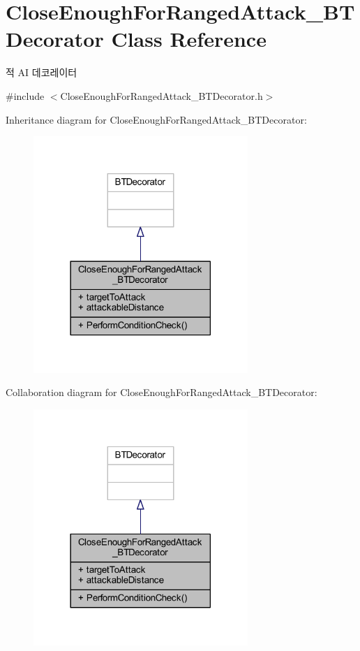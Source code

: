 \hypertarget{class_close_enough_for_ranged_attack___b_t_decorator}{}\section{Close\+Enough\+For\+Ranged\+Attack\+\_\+\+B\+T\+Decorator Class Reference}
\label{class_close_enough_for_ranged_attack___b_t_decorator}


적 AI 데코레이터  




{\ttfamily \#include $<$Close\+Enough\+For\+Ranged\+Attack\+\_\+\+B\+T\+Decorator.\+h$>$}



Inheritance diagram for Close\+Enough\+For\+Ranged\+Attack\+\_\+\+B\+T\+Decorator\+:
\nopagebreak
\begin{figure}[H]
\begin{center}
\leavevmode
\includegraphics[width=230pt]{class_close_enough_for_ranged_attack___b_t_decorator__inherit__graph}
\end{center}
\end{figure}


Collaboration diagram for Close\+Enough\+For\+Ranged\+Attack\+\_\+\+B\+T\+Decorator\+:
\nopagebreak
\begin{figure}[H]
\begin{center}
\leavevmode
\includegraphics[width=230pt]{class_close_enough_for_ranged_attack___b_t_decorator__coll__graph}
\end{center}
\end{figure}
